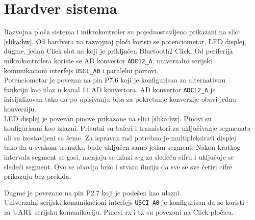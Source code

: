 \section{Hardver sistema}


Razvojna ploča sistema i mikrokontroler su pojednostavljeno prikazani na slici \ref{slika:hw}. Od hardvera na razvojnoj ploči koristi se potenciometar, LED displej, dugme, jedan Click slot na koji je priključen Bluetooth2 Click. Od periferija mikrokontrolera koriste se AD konvertor \verb+ADC12_A+, univerzalni serijski komunikacioni interfejs \verb+USCI_A0+ i paralelni portovi.\\

Potenciometar je povezan na pin P7.6 koji je konfigurisan za alternativnu funkciju kao ulaz u kanal 14 AD konvertora. AD konvertor \verb+ADC12_A+ je inicijalizovan tako da po upisivanju bita za pokretanje konverzije obavi jednu konverziju.\\

LED displej je povezan pinove prikazane na slici \ref{slika:hw}. Pinovi su konfigurisani kao izlazni. Prisutni su baferi i tranzistori za uključivanje segmenata ali su izostavljeni sa šeme. Za ispravan rad potrebno je multipleksirati displej tako da u svakom trenutku bude uključen samo jedan segment. Nakon kratkog intervala segment se gasi, menjaju se izlazi a-g za sledeću cifru i uključuje se sledeći segment. Ovo se obavlja brzo i stvara iluziju da sve se sve četiri cifre prikazuju bez prekida.

Dugme je povezano na pin P2.7 koji je podešen kao ulazni.\\

Univerzalni serijski komunikacioni interfejs \verb+USCI_A0+ je konfigurisan da se koristi za UART serijsku komunikaciju. Pinovi rx i tx su povezani na Click pločicu.\\